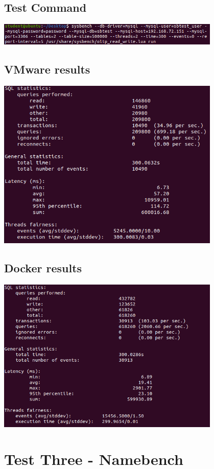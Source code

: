 \documentclass[12pt,twoside]{book}
\begin{document}
\subsection{Test Command}
\includegraphics[width=0.80\textwidth]{Appendicies/Test2Command.PNG}
\subsection{VMware results}
\includegraphics[width=0.80\textwidth]{Appendicies/VMwareTest2.PNG}
\subsection{Docker results}
\includegraphics[width=0.80\textwidth]{Appendicies/DockerTest2.PNG}

\section{Test Three - Namebench}
\end{document}

